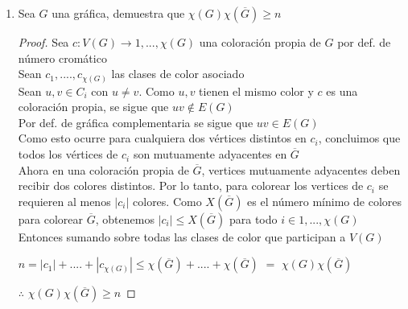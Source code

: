 \documentclass{article}
\begin{document}
\begin{enumerate}
\begin{itemize}
    \\ Entonces ningún de vértice de $G$ puede compartir color con algún vértice de $H$. Si compartieran un color, tendríamos que dos vértices
    vecinos comparten color, y ya no sería una coloración propia. \\
    $\therefore$ $c_1 \cap c_2 = \emptyset$ \\
    Como la coloración en $G$ sigue siendo propia, se necesitan al menos $\chi(G)$ colores distintos para $G$, por lo que $|c_1| \geq \chi(G)$ \\
    De manera analoga $|c_2| \geq \chi(H)$ \\
    Dado que las coloraciones que usamos son disjuntas, tenemos que:
    \begin{center}
      $\chi(G+H) = |c_1 \cup c_2| = |c_1| + |c_2| \geq \chi(G) + \chi(H)$
    \end{center}
  \end{itemize}
  $\therefore$ como vimos que es mayor igual y menor igual podemos concluir que. \\
  $\chi(G+H)$ $=$ $\chi(G)+\chi(H)$
  \newpage
\item Sea $G$ una gráfica, demuestra que $\chi(G)\chi(\overline{G}) \geq n$ 
  \begin{proof}
    
    Sea $c: V(G) \longrightarrow {1,...,\chi(G)}$ una coloración propia de $G$ por def. de número cromático \\
    Sean $c_1,....,c_{\chi(G)}$ las clases de color asociado \\
    \newline
    Sean $u,v \in C_i$ con $u \neq v$. Como $u,v$ tienen el mismo color y $c$ es una coloración propia, se sigue que $uv \notin E(G)$ \\
    Por def. de gráfica complementaria se sigue que $uv \in E(G)$ \\
    \newline
    Como esto ocurre para cualquiera dos vértices distintos en $c_i$, concluimos que todos los vértices de $c_i$ son mutuamente adyacentes
    en $\overline{G}$ \\
    \newline
    Ahora en una coloración propia de $\overline{G}$, vertices mutuamente adyacentes deben recibir dos colores distintos. Por lo tanto, para
    colorear los vertices de $c_i$ se requieren al menos $|c_i|$ colores. Como $X(\overline{G})$ es el número mínimo de colores para colorear
    $\overline{G}$, obtenemos $|c_i| \leq X(\overline{G})$ para todo $i \in {1,...,\chi(G)}$ \\
    Entonces sumando sobre todas las clases de color que participan a $V(G)$ \\
    \begin{center}
      $n = |c_1|+ ....+ |c_{\chi(G)}| \leq \chi(\overline{G})+....+\chi(\overline{G}) $ $=$ $\chi(G)\chi(\overline{G})$
    \end{center}
    $\therefore$ $\chi(G)\chi(\overline{G}) \geq n$


\end{proof}
\end{enumerate}
\end{document}
